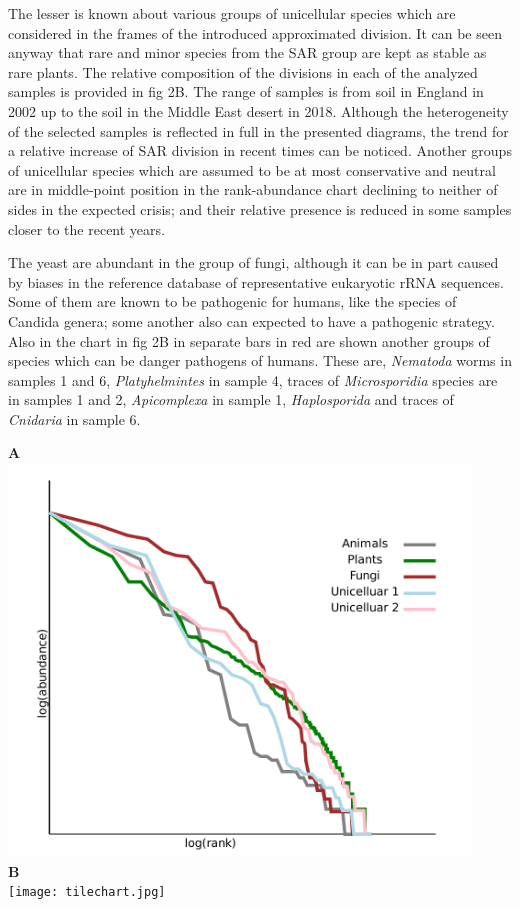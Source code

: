 \documentclass[a4paper]{article}
\begin{document}
The lesser is known about various groups of unicellular species which are considered in the frames of the introduced approximated division. It can be seen anyway that rare and minor species from the SAR group are kept as stable as rare plants. The relative composition of the divisions in each of the analyzed samples is provided in fig 2B. The range of samples is from soil in England in 2002 up to the soil in the Middle East desert in 2018. Although the heterogeneity of the selected samples is reflected in full in the presented diagrams, the trend for a relative increase of SAR division in recent times can be noticed. Another groups of unicellular species which are assumed to be at most conservative and neutral are in middle-point position in the rank-abundance chart declining to neither of sides in the expected crisis; and their relative presence is reduced in some samples closer to the recent years.

The yeast are abundant in the group of fungi, although it can be in part caused by biases in the reference database of representative eukaryotic rRNA sequences. Some of them are known to be pathogenic for humans, like the species of Candida genera; some another also can expected to have a pathogenic strategy. Also in the chart in fig 2B in separate bars in red are shown another groups of species which can be danger pathogens of humans. These are, \textit{Nematoda} worms in samples 1 and 6, \textit{Platyhelmintes} in sample 4,  traces of \textit{Microsporidia} species are in samples 1 and 2, \textit{Apicomplexa} in sample 1, \textit{Haplosporida} and traces of \textit{Cnidaria} in sample 6.


\newpage

{\large{\textbf{A}}}\\
\includegraphics[width=0.92\textwidth]{rankabundance.jpg}\\
{\large{\textbf{B}}}\\
\texttt{[image: tilechart.jpg]}\\
\end{document}
